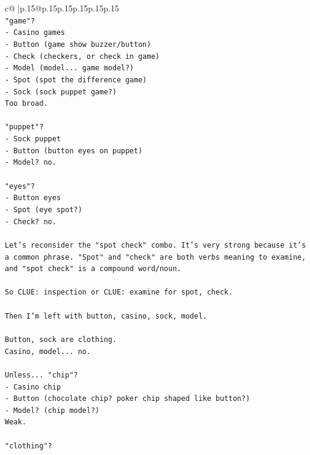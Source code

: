 \documentclass{article}
\begin{document}
{\begin{supertabular}{c@{$\;$}|p{.15\linewidth}@{}p{.15\linewidth}p{.15\linewidth}p{.15\linewidth}p{.15\linewidth}p{.15\linewidth}}
{{{\\ 
\texttt{"game"?} \\
\texttt{{-} Casino games} \\
\texttt{{-} Button (game show buzzer/button)} \\
\texttt{{-} Check (checkers, or check in game)} \\
\texttt{{-} Model (model... game model?)} \\
\texttt{{-} Spot (spot the difference game)} \\
\texttt{{-} Sock (sock puppet game?)} \\
\texttt{Too broad.} \\
\\ 
\texttt{"puppet"?} \\
\texttt{{-} Sock puppet} \\
\texttt{{-} Button (button eyes on puppet)} \\
\texttt{{-} Model? no.} \\
\\ 
\texttt{"eyes"?} \\
\texttt{{-} Button eyes} \\
\texttt{{-} Spot (eye spot?)} \\
\texttt{{-} Check? no.} \\
\\ 
\texttt{Let's reconsider the "spot check" combo. It's very strong because it's a common phrase. "Spot" and "check" are both verbs meaning to examine, and "spot check" is a compound word/noun.} \\
\\ 
\texttt{So CLUE: inspection or CLUE: examine for spot, check.} \\
\\ 
\texttt{Then I'm left with button, casino, sock, model.} \\
\\ 
\texttt{Button, sock are clothing.} \\
\texttt{Casino, model... no.} \\
\\ 
\texttt{Unless... "chip"?} \\
\texttt{{-} Casino chip} \\
\texttt{{-} Button (chocolate chip? poker chip shaped like button?)} \\
\texttt{{-} Model? (chip model?)} \\
\texttt{Weak.} \\
\\ 
\texttt{"clothing"?} \\
}}}
\end{supertabular}}
\end{document}
